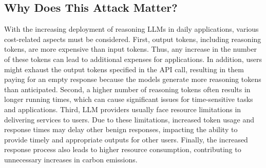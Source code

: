 \subsection{Why Does This Attack Matter?} \label{sec:consequences}
With the increasing deployment of reasoning LLMs in daily applications, various cost-related aspects must be considered. First, output tokens, including reasoning tokens, are more expensive than input tokens. Thus, any increase in the number of these tokens can lead to additional expenses for applications. In addition, users might exhaust the output tokens specified in the API call, resulting in them paying for an empty response because the models generate more reasoning tokens than anticipated. Second, a higher number of reasoning tokens often results in longer running times, which can cause significant issues for time-sensitive tasks and applications. Third, LLM providers usually face resource limitations in delivering services to users. Due to these limitations, increased token usage and response times may delay other benign responses, impacting the ability to provide timely and appropriate outputs for other users. Finally, the increased response process also leads to higher resource consumption, contributing to unnecessary increases in carbon emissions.











